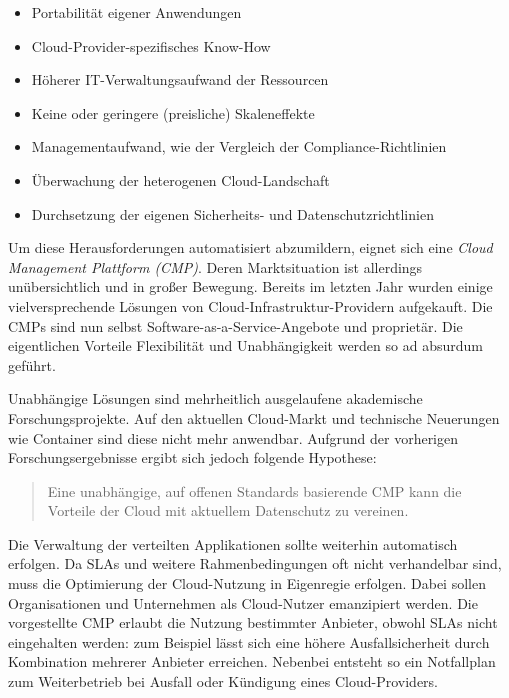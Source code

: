 \begin{itemize}
	\item Portabilität eigener Anwendungen
	\item Cloud-Provider-spezifisches Know-How
	\item Höherer IT-Verwaltungsaufwand der Ressourcen
	\item Keine oder geringere (preisliche) Skaleneffekte
	\item Managementaufwand, wie der Vergleich der Compliance-Richtlinien
	\item Überwachung der heterogenen Cloud-Landschaft
	\item Durchsetzung der eigenen Sicherheits- und Datenschutzrichtlinien
\end{itemize}

\noindent
Um diese Herausforderungen automatisiert abzumildern, eignet sich eine \emph{Cloud Management Plattform (CMP)}. Deren Marktsituation ist allerdings unübersichtlich und in großer Bewegung. Bereits im letzten Jahr wurden einige vielversprechende Lösungen von Cloud-Infrastruktur-Providern aufgekauft. Die CMPs sind nun selbst Software-as-a-Service-Angebote und proprietär. Die eigentlichen Vorteile Flexibilität und Unabhängigkeit werden so ad absurdum geführt.

Unabhängige Lösungen sind mehrheitlich ausgelaufene akademische Forschungsprojekte. Auf den aktuellen Cloud-Markt und technische Neuerungen wie Container sind diese nicht mehr anwendbar. Aufgrund der vorherigen Forschungsergebnisse ergibt sich jedoch folgende Hypothese:


\begin{verse}
{Eine unabhängige, auf offenen Standards basierende CMP kann die Vorteile der Cloud mit aktuellem Datenschutz zu vereinen.}
\end{verse}

\noindent Die Verwaltung der verteilten Applikationen sollte weiterhin automatisch erfolgen. Da SLAs und weitere Rahmenbedingungen oft nicht verhandelbar sind, muss die Optimierung der Cloud-Nutzung in Eigenregie erfolgen. Dabei sollen Organisationen und Unternehmen als Cloud-Nutzer emanzipiert werden. Die vorgestellte CMP erlaubt die Nutzung bestimmter Anbieter, obwohl SLAs  nicht eingehalten werden: zum Beispiel lässt sich eine höhere Ausfallsicherheit durch Kombination mehrerer Anbieter erreichen. Nebenbei entsteht so ein Notfallplan zum Weiterbetrieb bei Ausfall oder Kündigung eines Cloud-Providers.

